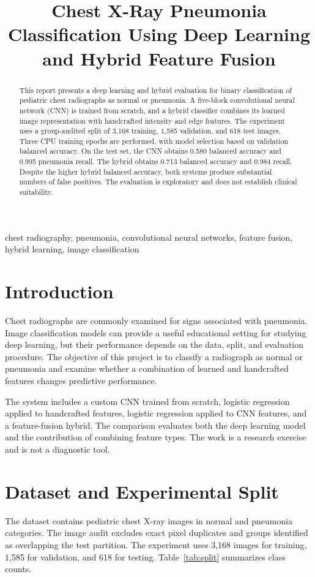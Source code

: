 \documentclass[conference]{IEEEtran}
\title{Chest X-Ray Pneumonia Classification Using Deep Learning and Hybrid Feature Fusion}
\author{}
\begin{document}
\maketitle

\begin{abstract}
This report presents a deep learning and hybrid evaluation for binary classification of pediatric chest radiographs as normal or pneumonia. A five-block convolutional neural network (CNN) is trained from scratch, and a hybrid classifier combines its learned image representation with handcrafted intensity and edge features. The experiment uses a group-audited split of 3,168 training, 1,585 validation, and 618 test images. Three CPU training epochs are performed, with model selection based on validation balanced accuracy. On the test set, the CNN obtains 0.580 balanced accuracy and 0.995 pneumonia recall. The hybrid obtains 0.713 balanced accuracy and 0.984 recall. Despite the higher hybrid balanced accuracy, both systems produce substantial numbers of false positives. The evaluation is exploratory and does not establish clinical suitability.
\end{abstract}

\begin{IEEEkeywords}
chest radiography, pneumonia, convolutional neural networks, feature fusion, hybrid learning, image classification
\end{IEEEkeywords}

\section{Introduction}
Chest radiographs are commonly examined for signs associated with pneumonia. Image classification models can provide a useful educational setting for studying deep learning, but their performance depends on the data, split, and evaluation procedure. The objective of this project is to classify a radiograph as normal or pneumonia and examine whether a combination of learned and handcrafted features changes predictive performance.

The system includes a custom CNN trained from scratch, logistic regression applied to handcrafted features, logistic regression applied to CNN features, and a feature-fusion hybrid. The comparison evaluates both the deep learning model and the contribution of combining feature types. The work is a research exercise and is not a diagnostic tool.

\section{Dataset and Experimental Split}
The dataset contains pediatric chest X-ray images in normal and pneumonia categories. The image audit excludes exact pixel duplicates and groups identified as overlapping the test partition. The experiment uses 3,168 images for training, 1,585 for validation, and 618 for testing. Table~\ref{tab:split} summarizes class counts.
\end{document}
